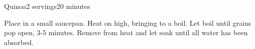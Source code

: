 \documentclass[../Cookbook.tex]{subfiles}
\begin{document}
\begin{recipe}{Quinoa}{2 servings}{20 minutes}

Place in a small saucepan. Heat on high, bringing to a boil. Let boil until grains pop open, 3-5 minutes. Remove from heat and let soak until all water has been absorbed.

\end{recipe}
\end{document}
